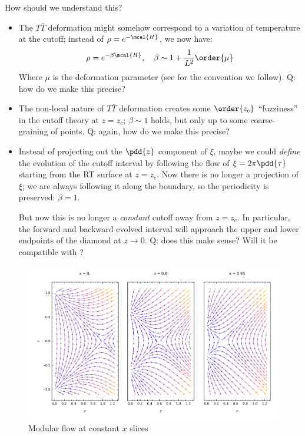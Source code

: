\documentclass[a4paper
	,10pt
]{article}
\makeatletter
\newcommand{\nobeginpar}{\@beginparpenalty=10000}
\makeatother
\begin{document}
{\nobeginpar
	How should we understand this?
	\begin{itemize}
	\item The $T\bar{T}$ deformation might somehow correspond to a variation of temperature at the cutoff; instead of $\rho = e^{-\mcal{H}}$, we now have:
	\begin{equation}
		\rho = e^{-\beta\mcal{H}},
	\quad \beta \sim 1 + \frac{1}{L^2} \order{\mu}
	\end{equation}
	Where $\mu$ is the deformation parameter (see \cite{Apolo:2019zai} for the convention we follow). Q: how do we make this precise?
	
	\item The non-local nature of $T\bar{T}$ deformation creates some $\order{z_c}$ ``fuzziness'' in the cutoff theory at $z = z_c$; $\beta \sim 1$ holds, but only up to some coarse-graining of points. Q: again, how do we make this precise?
	
	\item Instead of projecting out the $\pdd{z}$ component of $\xi$, maybe we could \textit{define} the evolution of the cutoff interval by following the flow of $\xi = 2\pi\pdd{\tau}$ starting from the RT surface at $z = z_c$. Now there is no longer a projection of $\xi$; we are always following it along the boundary, so the periodicity is preserved: $\beta = 1$. 
	
	But now this is no longer a \textit{constant} cutoff away from $z = z_c$. In particular, the forward and backward evolved interval will approach the upper and lower endpoints of the diamond at $z \to 0$. Q: does this make sense? Will it be compatible with \textcite{McGough:2016lol}?
	\end{itemize}
}
	
	\begin{figure}[!ht]
	\vspace{-1.5ex}
	\centering
	\includegraphics[width=.8\linewidth]{img/modFlowXsection.pdf}
	\hspace{2em}
	\vspace{-2ex}
	\caption{Modular flow at constant $x$ slices}
	\end{figure}
	
\end{document}
